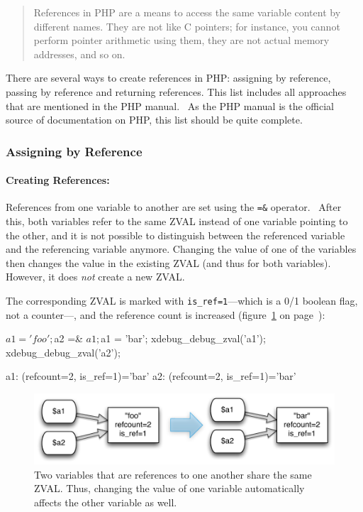 \begin{quote}
References in PHP are a means to access the same variable content by different names. They are not like C pointers; for instance, you cannot perform pointer arithmetic using them, they are not actual memory addresses, and so on.
\end{quote}

There are several ways to create references in PHP: assigning by reference, passing by reference and returning references. This list includes all approaches that are mentioned in the PHP manual.~\cite{php-manual-references} As the PHP manual is the official source of documentation on PHP, this list should be quite complete.


\subsubsection{Assigning by Reference}

\paragraph{Creating References:}

References from one variable to another are set using the \texttt{=\&} operator.~\cite[page 129]{wenz-php53}\cite{php-manual-what-references-do} After this, both variables refer to the same ZVAL instead of one variable pointing to the other, and it is not possible to distinguish between the referenced variable and the referencing variable anymore. Changing the value of one of the variables then changes the value in the existing ZVAL (and thus for both variables). However, it does \emph{not} create a new ZVAL.

The corresponding ZVAL is marked with \texttt{is\_ref=1}---which is a 0/1 boolean flag, not a counter---, and the reference count is increased (figure~\ref{fig:simple-reference} on page~\pageref{fig:simple-reference}):

\begin{phpcode}
$a1 = 'foo';
$a2 =& $a1;
$a1 = 'bar';
xdebug_debug_zval('a1');
xdebug_debug_zval('a2');
\end{phpcode}

\begin{textcode}
a1: (refcount=2, is_ref=1)='bar'
a2: (refcount=2, is_ref=1)='bar'
\end{textcode}

\begin{figure}[htb]
  \begin{center}
    \includegraphics[scale=0.8]{images/a1_a2}
    \caption{Two variables that are references to one another share the same ZVAL. Thus, changing the value of one variable automatically affects the other variable as well.}
    \label{fig:simple-reference}
  \end{center}
\end{figure}


